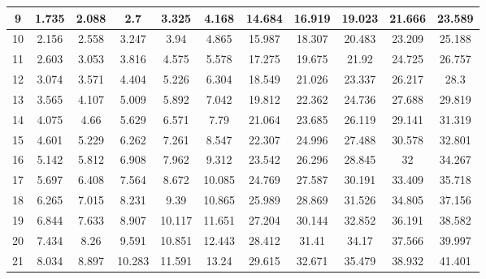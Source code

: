 \begin{table}[htb]
{\begin{tabular}{|c|c|c|c|c|c|c|c|c|c|c|}
9  & 1.735          & 2.088         & 2.7            & 3.325         & 4.168        & 14.684       & 16.919        & 19.023         & 21.666        & 23.589         \\ \hline
10 & 2.156          & 2.558         & 3.247          & 3.94          & 4.865        & 15.987       & 18.307        & 20.483         & 23.209        & 25.188         \\ \hline
11 & 2.603          & 3.053         & 3.816          & 4.575         & 5.578        & 17.275       & 19.675        & 21.92          & 24.725        & 26.757         \\ \hline
12 & 3.074          & 3.571         & 4.404          & 5.226         & 6.304        & 18.549       & 21.026        & 23.337         & 26.217        & 28.3           \\ \hline
13 & 3.565          & 4.107         & 5.009          & 5.892         & 7.042        & 19.812       & 22.362        & 24.736         & 27.688        & 29.819         \\ \hline
14 & 4.075          & 4.66          & 5.629          & 6.571         & 7.79         & 21.064       & 23.685        & 26.119         & 29.141        & 31.319         \\ \hline
15 & 4.601          & 5.229         & 6.262          & 7.261         & 8.547        & 22.307       & 24.996        & 27.488         & 30.578        & 32.801         \\ \hline
16 & 5.142          & 5.812         & 6.908          & 7.962         & 9.312        & 23.542       & 26.296        & 28.845         & 32            & 34.267         \\ \hline
17 & 5.697          & 6.408         & 7.564          & 8.672         & 10.085       & 24.769       & 27.587        & 30.191         & 33.409        & 35.718         \\ \hline
18 & 6.265          & 7.015         & 8.231          & 9.39          & 10.865       & 25.989       & 28.869        & 31.526         & 34.805        & 37.156         \\ \hline
19 & 6.844          & 7.633         & 8.907          & 10.117        & 11.651       & 27.204       & 30.144        & 32.852         & 36.191        & 38.582         \\ \hline
20 & 7.434          & 8.26          & 9.591          & 10.851        & 12.443       & 28.412       & 31.41         & 34.17          & 37.566        & 39.997         \\ \hline
21 & 8.034          & 8.897         & 10.283         & 11.591        & 13.24        & 29.615       & 32.671        & 35.479         & 38.932        & 41.401         \\ \hline

\end{tabular}}
\end{table}
